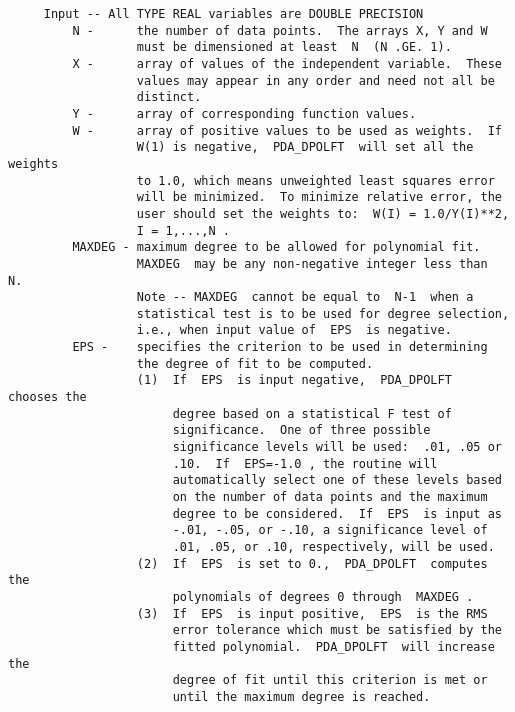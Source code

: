 \begin{verbatim}
     Input -- All TYPE REAL variables are DOUBLE PRECISION
         N -      the number of data points.  The arrays X, Y and W
                  must be dimensioned at least  N  (N .GE. 1).
         X -      array of values of the independent variable.  These
                  values may appear in any order and need not all be
                  distinct.
         Y -      array of corresponding function values.
         W -      array of positive values to be used as weights.  If
                  W(1) is negative,  PDA_DPOLFT  will set all the weights
                  to 1.0, which means unweighted least squares error
                  will be minimized.  To minimize relative error, the
                  user should set the weights to:  W(I) = 1.0/Y(I)**2,
                  I = 1,...,N .
         MAXDEG - maximum degree to be allowed for polynomial fit.
                  MAXDEG  may be any non-negative integer less than  N.
                  Note -- MAXDEG  cannot be equal to  N-1  when a
                  statistical test is to be used for degree selection,
                  i.e., when input value of  EPS  is negative.
         EPS -    specifies the criterion to be used in determining
                  the degree of fit to be computed.
                  (1)  If  EPS  is input negative,  PDA_DPOLFT  chooses the
                       degree based on a statistical F test of
                       significance.  One of three possible
                       significance levels will be used:  .01, .05 or
                       .10.  If  EPS=-1.0 , the routine will
                       automatically select one of these levels based
                       on the number of data points and the maximum
                       degree to be considered.  If  EPS  is input as
                       -.01, -.05, or -.10, a significance level of
                       .01, .05, or .10, respectively, will be used.
                  (2)  If  EPS  is set to 0.,  PDA_DPOLFT  computes the
                       polynomials of degrees 0 through  MAXDEG .
                  (3)  If  EPS  is input positive,  EPS  is the RMS
                       error tolerance which must be satisfied by the
                       fitted polynomial.  PDA_DPOLFT  will increase the
                       degree of fit until this criterion is met or
                       until the maximum degree is reached.


\end{verbatim}
